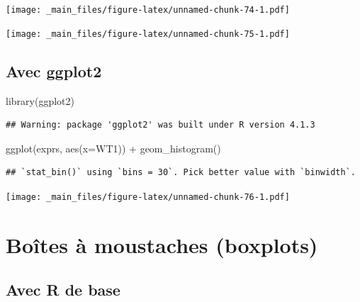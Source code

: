 \documentclass[
]{book}
\newenvironment{Shaded}{\begin{snugshade}}{\end{snugshade}}
\newcommand{\AttributeTok}[1]{\textcolor[rgb]{0.77,0.63,0.00}{#1}}
\newcommand{\FunctionTok}[1]{\textcolor[rgb]{0.00,0.00,0.00}{#1}}
\newcommand{\NormalTok}[1]{#1}
\newcommand{\SpecialCharTok}[1]{\textcolor[rgb]{0.00,0.00,0.00}{#1}}
\begin{document}
\texttt{[image: \_main\_files/figure-latex/unnamed-chunk-74-1.pdf]}

\begin{Shaded}
\end{Shaded}

\texttt{[image: \_main\_files/figure-latex/unnamed-chunk-75-1.pdf]}

\hypertarget{avec-ggplot2}{%
\subsection{Avec ggplot2}\label{avec-ggplot2}}

\begin{Shaded}
\begin{Highlighting}[]
\FunctionTok{library}\NormalTok{(ggplot2)}
\end{Highlighting}
\end{Shaded}

\begin{verbatim}
## Warning: package 'ggplot2' was built under R version 4.1.3
\end{verbatim}

\begin{Shaded}
\begin{Highlighting}[]
\FunctionTok{ggplot}\NormalTok{(exprs, }\FunctionTok{aes}\NormalTok{(}\AttributeTok{x=}\NormalTok{WT1)) }\SpecialCharTok{+} \FunctionTok{geom\_histogram}\NormalTok{()}
\end{Highlighting}
\end{Shaded}

\begin{verbatim}
## `stat_bin()` using `bins = 30`. Pick better value with `binwidth`.
\end{verbatim}

\texttt{[image: \_main\_files/figure-latex/unnamed-chunk-76-1.pdf]}

\hypertarget{bouxeetes-uxe0-moustaches-boxplots}{%
\section{Boîtes à moustaches (boxplots)}\label{bouxeetes-uxe0-moustaches-boxplots}}

\hypertarget{avec-r-de-base-1}{%
\subsection{Avec R de base}\label{avec-r-de-base-1}}
\end{document}

